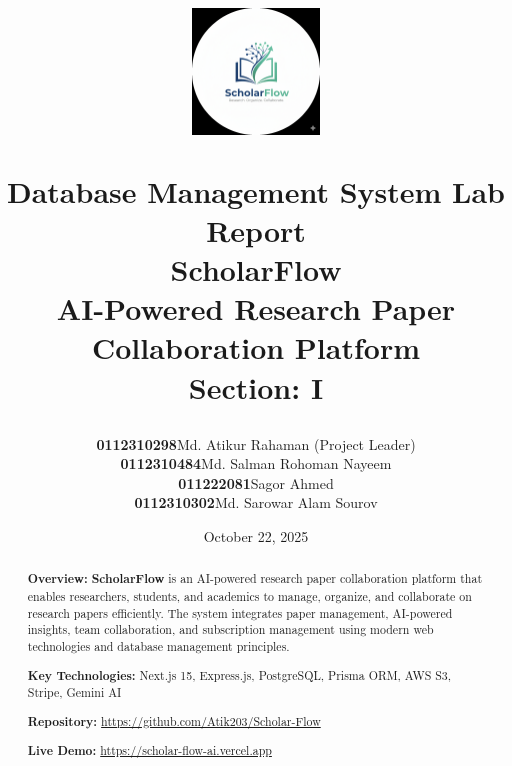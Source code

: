\documentclass[12pt,a4paper]{article}
\title{
    \vspace{-2cm}
    \begin{figure}[h]
    \centering
    \includegraphics[width=0.3\textwidth]{images/logos/logo.png}
    \end{figure}
    \vspace{0.3cm}
    {\Large\textbf{Database Management System Lab Report}}\\
    \vspace{0.4cm}
    {\LARGE\textcolor{primaryblue}{\textbf{ScholarFlow}}}\\
    \vspace{0.3cm}
    {\large AI-Powered Research Paper Collaboration Platform}\\
    \vspace{0.5cm}
    {\normalsize\textbf{Section: I}}
}
\author{
    \begin{tabular}{rl}
    \textbf{0112310298} & Md. Atikur Rahaman (Project Leader) \\
    \textbf{0112310484} & Md. Salman Rohoman Nayeem \\
    \textbf{011222081} & Sagor Ahmed \\
    \textbf{0112310302} & Md. Sarowar Alam Sourov \\
    \end{tabular}
}
\date{October 22, 2025}
\newcommand{\projectname}{\textbf{\textcolor{primaryblue}{ScholarFlow}}}
\begin{document}
\maketitle
\thispagestyle{empty}

\newpage

\begin{abstract}
\noindent
\textbf{Overview:} \projectname{} is an AI-powered research paper collaboration platform that enables researchers, students, and academics to manage, organize, and collaborate on research papers efficiently. The system integrates paper management, AI-powered insights, team collaboration, and subscription management using modern web technologies and database management principles.

\vspace{0.3cm}
\noindent
\textbf{Key Technologies:} Next.js 15, Express.js, PostgreSQL, Prisma ORM, AWS S3, Stripe, Gemini AI

\vspace{0.3cm}
\noindent
\textbf{Repository:} \url{https://github.com/Atik203/Scholar-Flow}

\vspace{0.3cm}
\noindent
\textbf{Live Demo:} \url{https://scholar-flow-ai.vercel.app}
\end{abstract}

\newpage

\tableofcontents
\newpage
















\end{document}
